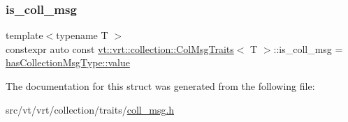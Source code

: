 \subsubsection{\texorpdfstring{is\+\_\+coll\+\_\+msg}{is\_coll\_msg}}
{\footnotesize\ttfamily template$<$typename T $>$ \\
constexpr auto const \hyperlink{structvt_1_1vrt_1_1collection_1_1_col_msg_traits}{vt\+::vrt\+::collection\+::\+Col\+Msg\+Traits}$<$ T $>$\+::is\+\_\+coll\+\_\+msg = \hyperlink{structdetection_1_1detector_a6d7d0e1bdf5903db9edbe448edccf83b}{has\+Collection\+Msg\+Type\+::value}\hspace{0.3cm}{\ttfamily [static]}}



The documentation for this struct was generated from the following file\+:\begin{DoxyCompactItemize}
\item 
src/vt/vrt/collection/traits/\hyperlink{coll__msg_8h}{coll\+\_\+msg.\+h}\end{DoxyCompactItemize}
